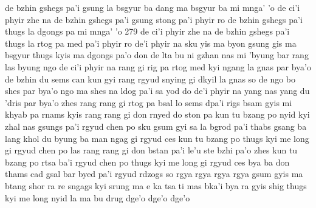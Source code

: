 de bzhin gshegs pa'i gsung la bsgyur ba dang ma bsgyur ba mi mnga' 'o
de ci'i phyir zhe na de bzhin gshegs pa'i gsung stong pa'i phyir ro
de bzhin gshegs pa'i thugs la dgongs pa mi mnga' 'o
279
de ci'i phyir zhe na de bzhin gshegs pa'i thugs la rtog pa med pa'i phyir ro
de'i phyir na sku yis ma byon
gsung gis ma bsgyur
thugs kyis ma dgongs pa'o
don de lta bu ni gzhan nas mi 'byung bar rang las byung ngo
de ci'i phyir na rang gi rig pa rtog med kyi ngang la gnas par bya'o
de bzhin du sems can kun gyi rang rgyud snying gi dkyil la gnas so
de ngo bo shes par bya'o
ngo ma shes na ldog pa'i sa yod do
de'i phyir na yang nas yang du 'dris par bya'o
zhes rang rang gi rtog pa bsal lo
sems dpa'i rigs bsam gyis mi khyab pa rnams kyis rang rang gi don rnyed do
ston pa kun tu bzang po nyid kyi zhal nas gsungs pa'i rgyud chen po
sku gsum gyi sa la bgrod pa'i thabs
gsang ba lang khol du byung ba man ngag gi rgyud ces kun tu bzang po thugs kyi me long gi rgyud chen po las
rang rang gi don bstan pa'i le'u ste bzhi pa'o
zhes kun tu bzang po rtsa ba'i rgyud chen po thugs kyi me long gi rgyud ces bya ba
don thams cad gsal bar byed pa'i rgyud rdzogs so
rgya rgya rgya
rgya gsum gyis ma btang shor ra re
sngags kyi srung ma e ka tsa ti mas
bka'i bya ra gyis shig
thugs kyi me long nyid la ma bu drug
dge'o dge'o dge'o
